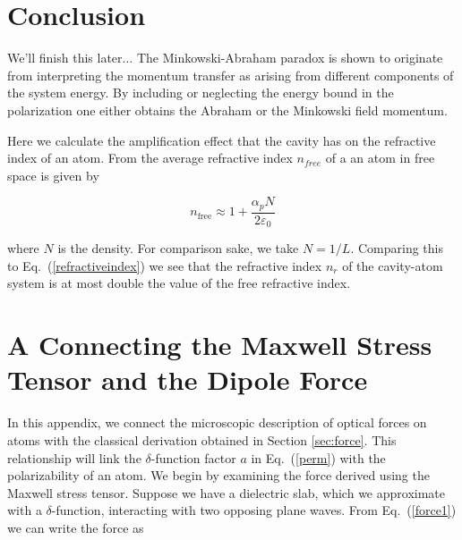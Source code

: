 
\section{Conclusion}
\label{sec:conclusion}

We'll finish this later...
The Minkowski-Abraham paradox is shown to originate from interpreting the momentum transfer as arising from different components of the system energy. By including or neglecting the energy bound in the polarization one either obtains the Abraham or the Minkowski field momentum.  
  
Here we calculate the amplification effect that the cavity has on the refractive index of an atom.  From \cite{cohentannoudji} the average refractive index $n_{free}$ of a an atom in free space is given by

\begin{equation}
n_{\mathrm{free}}\approx 1+\frac{\alpha_{p}N}{2\varepsilon_{0}}
\end{equation}

where $N$ is the density.  For comparison sake, we take $N=1/L$.  Comparing this to Eq.\ (\ref{refractiveindex}) we see that the refractive index $n_{r}$ of the cavity-atom system is at most double the value of the free refractive index. 

\section{A Connecting the Maxwell Stress Tensor and the Dipole Force}
\label{sec:AppendixAMaxwellvsQOforce}


In this appendix, we connect the microscopic description of optical forces on atoms \cite{cohentannoudji} with the classical derivation obtained in Section \ref{sec:force}.  
This relationship will link the $\delta$-function factor $a$ in Eq.\ (\ref{perm}) with the polarizability of an atom. We begin by examining the force 
derived using the Maxwell stress tensor.  Suppose we have a dielectric slab, which we approximate with a $\delta$-function, interacting with two opposing plane waves. 
From Eq.\ (\ref{force1}) we can write the force as

